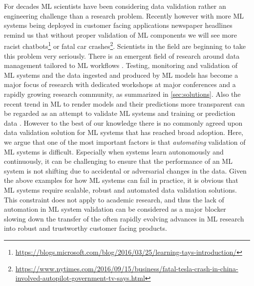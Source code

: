 For decades ML scientists have been considering data validation rather an engineering challenge than a research problem. Recently however with more ML systems being deployed in customer facing applications newspaper headlines remind us that without proper validation of ML components we will see more racist chatbots\footnote{\scriptsize\url{https://blogs.microsoft.com/blog/2016/03/25/learning-tays-introduction/}} or fatal car crashes\footnote{\scriptsize\url{https://www.nytimes.com/2016/09/15/business/fatal-tesla-crash-in-china-involved-autopilot-government-tv-says.html}}. Scientists in the field are beginning to take this problem very seriously. There is an emergent field of research around data management tailored to ML workflows \cite{Kumar2017}. Testing, monitoring and validation of ML systems and the data ingested and produced by ML models has become a major focus of research with dedicated workshops at major conferences and a rapidly growing research community, as summarized in \autoref{sec:solutions}. Also the recent trend in ML to render models and their predictions more transparent \cite{Samek2019} can be regarded as an attempt to validate ML systems and training or prediction data \cite{Zhang2020}.
%
However to the best of our knowledge there is no commonly agreed upon data validation solution for ML systems that has reached broad adoption. Here, we argue that one of the most important factors is that {\em automating} validation of ML systems is difficult. Especially when systems learn autonomously and continuously, it can be challenging to ensure that the performance of an ML system is not shifting due to accidental or adversarial changes in the data. Given the above examples for how ML systems can fail in practice, it is obvious that ML systems require scalable, robust and automated data validation solutions. This constraint does not apply to academic research, and thus the lack of automation in ML system validation can be considered as a major blocker slowing down the transfer of the often rapidly evolving advances in ML research into robust and trustworthy customer facing products. 


